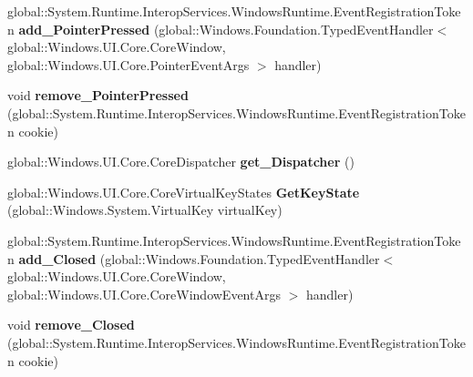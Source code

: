 \begin{DoxyCompactItemize}
global\+::\+System.\+Runtime.\+Interop\+Services.\+Windows\+Runtime.\+Event\+Registration\+Token {\bfseries add\+\_\+\+Pointer\+Pressed} (global\+::\+Windows.\+Foundation.\+Typed\+Event\+Handler$<$ global\+::\+Windows.\+U\+I.\+Core.\+Core\+Window, global\+::\+Windows.\+U\+I.\+Core.\+Pointer\+Event\+Args $>$ handler)
\item 
\mbox{\label{interface_windows_1_1_u_i_1_1_core_1_1_i_core_window_a424e6380efab58ea6d5ecf929352533e}} 
void {\bfseries remove\+\_\+\+Pointer\+Pressed} (global\+::\+System.\+Runtime.\+Interop\+Services.\+Windows\+Runtime.\+Event\+Registration\+Token cookie)
\item 
\mbox{\label{interface_windows_1_1_u_i_1_1_core_1_1_i_core_window_a84c5feb5e529a4fd9769d23af62c0763}} 
global\+::\+Windows.\+U\+I.\+Core.\+Core\+Dispatcher {\bfseries get\+\_\+\+Dispatcher} ()
\item 
\mbox{\label{interface_windows_1_1_u_i_1_1_core_1_1_i_core_window_ac983b3644c53ef4b42a3eb558847dcb6}} 
global\+::\+Windows.\+U\+I.\+Core.\+Core\+Virtual\+Key\+States {\bfseries Get\+Key\+State} (global\+::\+Windows.\+System.\+Virtual\+Key virtual\+Key)
\item 
\mbox{\label{interface_windows_1_1_u_i_1_1_core_1_1_i_core_window_af63b2d92b72f409da0deec79fc273cde}} 
global\+::\+System.\+Runtime.\+Interop\+Services.\+Windows\+Runtime.\+Event\+Registration\+Token {\bfseries add\+\_\+\+Closed} (global\+::\+Windows.\+Foundation.\+Typed\+Event\+Handler$<$ global\+::\+Windows.\+U\+I.\+Core.\+Core\+Window, global\+::\+Windows.\+U\+I.\+Core.\+Core\+Window\+Event\+Args $>$ handler)
\item 
\mbox{\label{interface_windows_1_1_u_i_1_1_core_1_1_i_core_window_a3b1e8bcb2b7b6bc77e9940d05dcf087a}} 
void {\bfseries remove\+\_\+\+Closed} (global\+::\+System.\+Runtime.\+Interop\+Services.\+Windows\+Runtime.\+Event\+Registration\+Token cookie)
\item 
\mbox{\label{interface_windows_1_1_u_i_1_1_core_1_1_i_core_window_a6cdc5bf478aeb08105b96b21b6a7d51c}} 

\end{DoxyCompactItemize}
